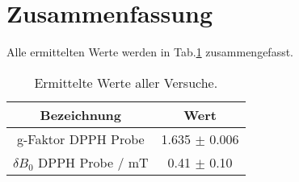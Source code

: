 \section{Zusammenfassung}
\label{sec:zusammenfassung}


Alle ermittelten Werte werden in Tab.\ref{tab:zus-Werte} zusammengefasst.
\begin{table}[H]
    \centering
    \caption{
        Ermittelte Werte aller Versuche.
    }
    \begin{tabular}{cc} \hline
        Bezeichnung & Wert \\ \hline
        g-Faktor DPPH Probe  & 1.635 $\pm$ 0.006 \\ \hline
        $\delta B_0$ DPPH Probe / mT  & 0.41 $\pm$ 0.10 \\ \hline
    \end{tabular}
    \label{tab:zus-Werte}
\end{table}